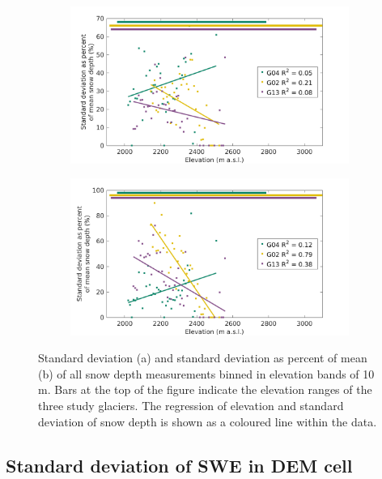 \documentclass{sfuthesis}
\begin{document}
\begin{appendices}
\begin{figure}
    \centering
    \begin{subfigure}[b]{0.8\textwidth}
        \includegraphics[width=\textwidth]{binned_std.png}
        \caption{}
    \end{subfigure}
    
    \begin{subfigure}[b]{0.8\textwidth}
        \includegraphics[width=\textwidth]{binned_std_percent.png}
        \caption{}
    \end{subfigure}

    \caption{Standard deviation (a) and standard deviation as percent of mean (b) of all snow depth measurements binned in elevation bands of 10 m. Bars at the top of the figure indicate the elevation ranges of the three study glaciers. The regression of elevation and standard deviation of snow depth is shown as a coloured line within the data.}
    \label{fig:std_snowdepth_binned}
\end{figure}

\subsection{Standard deviation of SWE in DEM cell}


\end{appendices}
\end{document}
